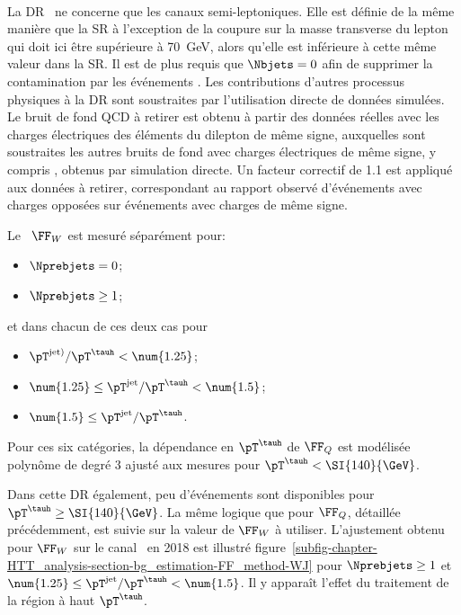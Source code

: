 \paragraph{\Wjets}
La DR \Wjets\ ne concerne que les canaux semi-leptoniques.
Elle est définie de la même manière que la SR à l'exception de la coupure sur la masse transverse du lepton qui doit ici être supérieure à \SI{70}{\GeV}, alors qu'elle est inférieure à cette même valeur dans la SR.
Il est de plus requis que $\Nbjets=0$ afin de supprimer la contamination par les événements \ttbar.
Les contributions d'autres processus physiques à la DR sont soustraites par l'utilisation directe de données simulées.
Le bruit de fond QCD à retirer est obtenu à partir des données réelles avec les charges électriques des éléments du dilepton de même signe, auxquelles sont soustraites les autres bruits de fond avec charges électriques de même signe, y compris \Wjets, obtenus par simulation directe.
Un facteur correctif de \num{1.1} est appliqué aux données à retirer, correspondant au rapport observé d'événements avec charges opposées sur événements avec charges de même signe.
\par
Le \fakefactor\ $\FF_W$ est mesuré séparément pour:
\begin{itemize}
\item $\Nprebjets=0$;
\item $\Nprebjets\geq1$;
\end{itemize}
et dans chacun de ces deux cas pour
\begin{itemize}
\item $\pT^{\text{jet})}/\pT^{\tauh} < \num{1.25}$;
\item $\num{1.25} \leq \pT^\text{jet}/\pT^{\tauh} < \num{1.5}$;
\item $\num{1.5} \leq \pT^\text{jet}/\pT^{\tauh}$.
\end{itemize}
Pour ces six catégories, la dépendance en $\pT^{\tauh}$ de $\FF_Q$ est modélisée polynôme de degré 3 ajusté aux mesures pour $\pT^{\tauh}<\SI{140}{\GeV}$.
\par
Dans cette DR également, peu d'événements sont disponibles pour $\pT^{\tauh}\geq\SI{140}{\GeV}$.
La même logique que pour $\FF_Q$, détaillée précédemment, est suivie sur la valeur de $\FF_W$ à utiliser.
L'ajustement obtenu pour $\FF_W$ sur le canal \mu\tauh\ en 2018 est illustré figure~\ref{subfig-chapter-HTT_analysis-section-bg_estimation-FF_method-WJ} pour $\Nprebjets\geq1$ et $\num{1.25} \leq \pT^\text{jet}/\pT^{\tauh} < \num{1.5}$.
Il y apparaît l'effet du traitement de la région à haut $\pT^{\tauh}$.
